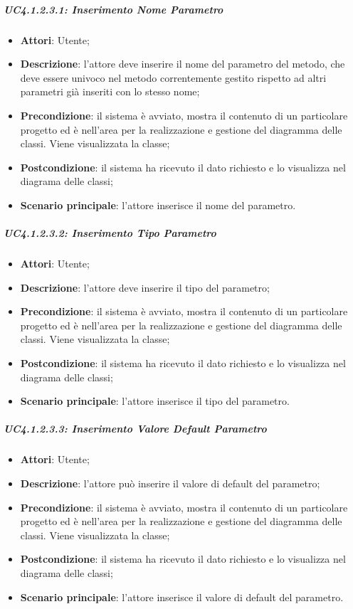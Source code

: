 \subparagraph{UC4.1.2.3.1: Inserimento Nome Parametro}
\label{UC4.1.2.3.1}
\begin{itemize}
	\item \textbf{Attori}: Utente;
	\item \textbf{Descrizione}: l'attore deve inserire il nome del parametro del metodo, che deve essere univoco nel metodo correntemente gestito rispetto ad altri parametri già inseriti con lo stesso nome;
	\item \textbf{Precondizione}: il sistema è avviato, mostra il contenuto di un particolare progetto ed è nell'area per la realizzazione e gestione del diagramma delle classi. Viene visualizzata la classe;
	\item \textbf{Postcondizione}: il sistema ha ricevuto il dato richiesto e lo visualizza nel diagrama delle classi;
	\item \textbf{Scenario principale}: l'attore inserisce il nome del parametro.
\end{itemize}

\subparagraph{UC4.1.2.3.2: Inserimento Tipo Parametro}
\label{UC4.1.2.3.2}
\begin{itemize}
	\item \textbf{Attori}: Utente;
	\item \textbf{Descrizione}: l'attore deve inserire il tipo del parametro;
	\item \textbf{Precondizione}: il sistema è avviato, mostra il contenuto di un particolare progetto ed è nell'area per la realizzazione e gestione del diagramma delle classi. Viene visualizzata la classe;
	\item \textbf{Postcondizione}: il sistema ha ricevuto il dato richiesto e lo visualizza nel diagrama delle classi;
	\item \textbf{Scenario principale}: l'attore inserisce il tipo del parametro.
\end{itemize}

\subparagraph{UC4.1.2.3.3: Inserimento Valore Default Parametro}
\label{UC4.1.2.3.3}
\begin{itemize}
	\item \textbf{Attori}: Utente;
	\item \textbf{Descrizione}: l'attore può inserire il valore di default del parametro;
	\item \textbf{Precondizione}: il sistema è avviato, mostra il contenuto di un particolare progetto ed è nell'area per la realizzazione e gestione del diagramma delle classi. Viene visualizzata la classe;
	\item \textbf{Postcondizione}: il sistema ha ricevuto il dato richiesto e lo visualizza nel diagrama delle classi;
	\item \textbf{Scenario principale}: l'attore inserisce  il valore di default del parametro.
\end{itemize}

